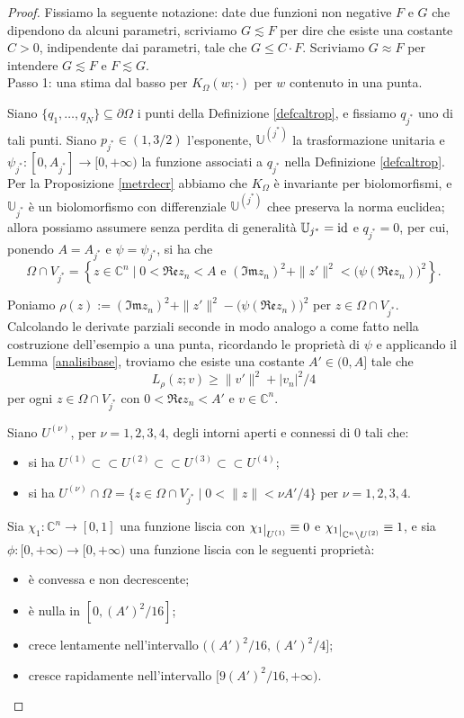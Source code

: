 \begin{proof}
    Fissiamo la seguente notazione: date due funzioni non negative $F$ e $G$ che dipendono da alcuni parametri, scriviamo $G\lesssim F$ per dire che esiste una costante $C>0$, indipendente dai parametri, tale che $G\le C\cdot F$. Scriviamo $G\approx F$ per intendere $G\lesssim F$ e $F\lesssim G$.\\

    Passo 1: una stima dal basso per $K_\Omega(w;\cdot)$ per $w$ contenuto in una punta.

    Siano $\{q_1,\dots,q_N\}\subseteq\partial\Omega$ i punti della Definizione \ref{defcaltrop}, e fissiamo $q_{j^*}$ uno di tali punti. Siano $p_{j^*}\in(1,3/2)$ l'esponente, $\mathbb{U}^{(j^*)}$ la trasformazione unitaria e $\psi_{j^*}:[0,A_{j^*}]\longrightarrow[0,+\infty)$ la funzione associati a $q_{j^*}$ nella Definizione \ref{defcaltrop}. Per la Proposizione \ref{metrdecr} abbiamo che $K_\Omega$ è invariante per biolomorfismi, e $\mathbb{U}_{j^*}$ è un biolomorfismo con differenziale $\mathbb{U}^{(j^*)}$ chee preserva la norma euclidea; allora possiamo assumere senza perdita di generalità $\mathbb{U}_{j^*}=\operatorname{id}$ e $q_{j^*}=0$, per cui, ponendo $A=A_{j^*}$ e $\psi=\psi_{j^*}$, si ha che
    $$\Omega\cap V_{j^*}=\left\{z\in\mathbb{C}^n\mid 0<\mathfrak{Re}z_n<A\text{ e }(\mathfrak{Im}z_n)^2+\|z'\|^2<\big(\psi(\mathfrak{Re}z_n)\big)^2\right\}.$$

    Poniamo $\rho(z):=(\mathfrak{Im}z_n)^2+\|z'\|^2-\big(\psi(\mathfrak{Re}z_n)\big)^2$ per $z\in\Omega\cap V_{j^*}$. Calcolando le derivate parziali seconde in modo analogo a come fatto nella costruzione dell'esempio a una punta, ricordando le proprietà di $\psi$ e applicando il Lemma \ref{analisibase}, troviamo che esiste una costante $A'\in(0,A]$ tale che
    $$L_\rho(z;v) \ge \|v'\|^2+|v_n|^2/4$$
    per ogni $z\in\Omega\cap V_{j^*}$ con $0<\mathfrak{Re}z_n<A'$ e $v\in\mathbb{C}^n$.

    Siano $U^{(\nu)}$, per $\nu=1,2,3,4$, degli intorni aperti e connessi di $0$ tali che:
    \begin{itemize}
        \item si ha $U^{(1)}\subset\subset U^{(2)}\subset\subset U^{(3)}\subset\subset U^{(4)}$;
        \item si ha $U^{(\nu)}\cap\Omega=\{z\in\Omega\cap V_{j^*}\mid0<\|z\|<\nu A'/4\}$ per $\nu=1,2,3,4$.
    \end{itemize}

    Sia $\chi_1:\mathbb{C}^n\longrightarrow[0,1]$ una funzione liscia con $\chi_1\restrict{U^{(1)}}\equiv 0$ e $\chi_1\restrict{\mathbb{C}^n\setminus U^{(2)}}\equiv 1$, e sia $\phi:[0,+\infty)\longrightarrow[0,+\infty)$ una funzione liscia con le seguenti proprietà:
    \begin{itemize}
        \item è convessa e non decrescente;
        \item è nulla in $[0,(A')^2/16]$;
        \item crece lentamente nell'intervallo $((A')^2/16,(A')^2/4]$;
        \item cresce rapidamente nell'intervallo $[9(A')^2/16,+\infty)$.
    \end{itemize}


\end{proof}
